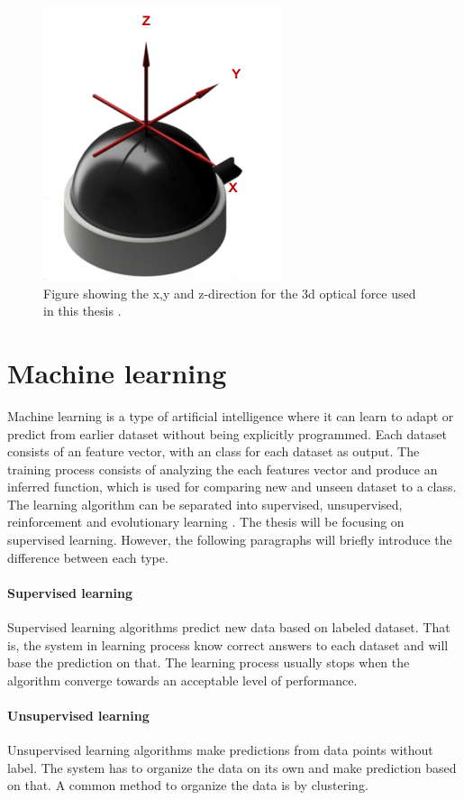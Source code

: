 \documentclass[USenglish]{ifimaster}  %
\begin{document}
\begin{figure}[h]
	\centering
	\includegraphics[scale=0.8]{Figures/OptoforceAxis3}
	\caption{Figure showing the x,y and z-direction for the 3d optical force used in this thesis \cite{OptoforceSheet}.}
	\label{fig:OptoforceAxis}
\end{figure}

\section {Machine learning}
Machine learning is a type of artificial intelligence where it can learn to adapt or predict from earlier dataset without being explicitly programmed. Each dataset consists of an feature vector, with an class for each dataset as output. The training process consists of analyzing the each features vector and produce an inferred function, which is used for comparing new and unseen dataset to a class. The learning algorithm can be separated into supervised, unsupervised, reinforcement and evolutionary learning \cite{Marsland:2009:MLA:1571643}. The thesis will be focusing on supervised learning. However, the following paragraphs will briefly introduce the difference between each type.

\paragraph{Supervised learning}
Supervised learning algorithms predict new data based on labeled dataset. That is, the system in learning process know correct answers to each dataset and will base the prediction on that. The learning process usually stops when the algorithm converge towards an acceptable level of performance.

\paragraph{Unsupervised learning}
Unsupervised learning algorithms make predictions from data points without label. The system has to organize the data on its own and make prediction based on that. A common method to organize the data is by clustering.
\end{document}

